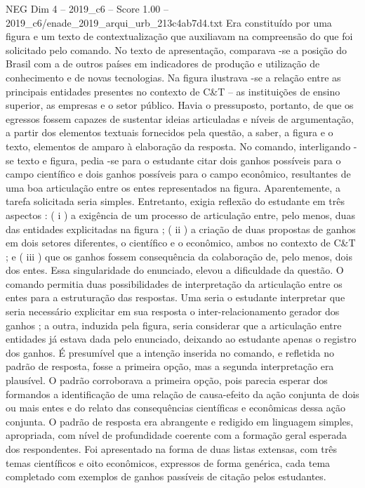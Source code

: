 \begin{textsample}{NEG Dim 4 – 2019\_c6 – Score 1.00 – 2019\_c6/enade\_2019\_arqui\_urb\_213c4ab7d4.txt}
Era constituído por uma figura e um texto de contextualização que auxiliavam na compreensão do que foi solicitado pelo comando.
No texto de apresentação, comparava -se a posição do Brasil com a de outros países em indicadores de produção e utilização de conhecimento e de novas tecnologias.
Na figura ilustrava -se a relação entre as principais entidades presentes no contexto de C\&T – as instituições de ensino superior, as empresas e o setor público.
Havia o pressuposto, portanto, de que os egressos fossem capazes de sustentar ideias articuladas e níveis de argumentação, a partir dos elementos textuais fornecidos pela questão, a saber, a figura e o texto, elementos de amparo à elaboração da resposta.
No comando, interligando -se texto e figura, pedia -se para o estudante citar dois ganhos possíveis para o campo científico e dois ganhos possíveis para o campo econômico, resultantes de uma boa articulação entre os entes representados na figura.
Aparentemente, a tarefa solicitada seria simples.
Entretanto, exigia reflexão do estudante em três aspectos : ( i ) a exigência de um processo de articulação entre, pelo menos, duas das entidades explicitadas na figura ; ( ii ) a criação de duas propostas de ganhos em dois setores diferentes, o científico e o econômico, ambos no contexto de C\&T ; e ( iii ) que os ganhos fossem consequência da colaboração de, pelo menos, dois dos entes.
Essa singularidade do enunciado, elevou a dificuldade da questão.
O comando permitia duas possibilidades de interpretação da articulação entre os entes para a estruturação das respostas.
Uma seria o estudante interpretar que seria necessário explicitar em sua resposta o inter-relacionamento gerador dos ganhos ; a outra, induzida pela figura, seria considerar que a articulação entre entidades já estava dada pelo enunciado, deixando ao estudante apenas o registro dos ganhos.
É presumível que a intenção inserida no comando, e refletida no padrão de resposta, fosse a primeira opção, mas a segunda interpretação era plausível.
O padrão corroborava a primeira opção, pois parecia esperar dos formandos a identificação de uma relação de causa-efeito da ação conjunta de dois ou mais entes e do relato das consequências científicas e econômicas dessa ação conjunta.
O padrão de resposta era abrangente e redigido em linguagem simples, apropriada, com nível de profundidade coerente com a formação geral esperada dos respondentes.
Foi apresentado na forma de duas listas extensas, com três temas científicos e oito econômicos, expressos de forma genérica, cada tema completado com exemplos de ganhos passíveis de citação pelos estudantes.

\end{textsample}
